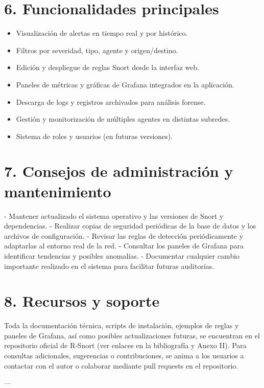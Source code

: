 \documentclass[11pt,a4paper,twoside]{report}
\begin{document}
\section*{6. Funcionalidades principales}

\begin{itemize}
	\item Visualización de alertas en tiempo real y por histórico.
	\item Filtros por severidad, tipo, agente y origen/destino.
	\item Edición y despliegue de reglas Snort desde la interfaz web.
	\item Paneles de métricas y gráficas de Grafana integrados en la aplicación.
	\item Descarga de logs y registros archivados para análisis forense.
	\item Gestión y monitorización de múltiples agentes en distintas subredes.
	\item Sistema de roles y usuarios (en futuras versiones).
\end{itemize}

\section*{7. Consejos de administración y mantenimiento}

- Mantener actualizado el sistema operativo y las versiones de Snort y dependencias.
- Realizar copias de seguridad periódicas de la base de datos y los archivos de configuración.
- Revisar las reglas de detección periódicamente y adaptarlas al entorno real de la red.
- Consultar los paneles de Grafana para identificar tendencias y posibles anomalías.
- Documentar cualquier cambio importante realizado en el sistema para facilitar futuras auditorías.

\section*{8. Recursos y soporte}

Toda la documentación técnica, scripts de instalación, ejemplos de reglas y paneles de Grafana, así como posibles actualizaciones futuras, se encuentran en el repositorio oficial de R-Snort (ver enlaces en la bibliografía y Anexo II). Para consultas adicionales, sugerencias o contribuciones, se anima a los usuarios a contactar con el autor o colaborar mediante pull requests en el repositorio.

---
\end{document}
